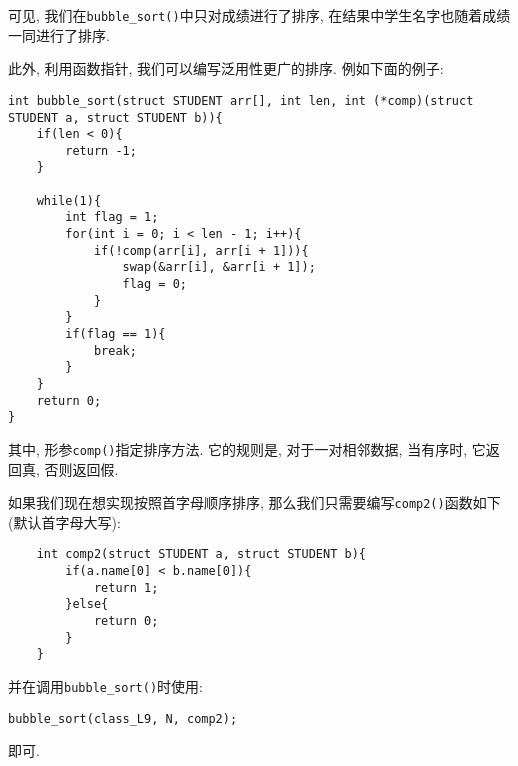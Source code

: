     可见, 我们在\texttt{bubble\_sort()}中只对成绩进行了排序, 在结果中学生名字也随着成绩一同进行了排序.

    \begin{mdframed}[linecolor=gray]

    此外, 利用函数指针, 我们可以编写泛用性更广的排序. 例如下面的例子:
\begin{lstlisting}
int bubble_sort(struct STUDENT arr[], int len, int (*comp)(struct STUDENT a, struct STUDENT b)){
    if(len < 0){
        return -1;
    }

    while(1){
        int flag = 1;
        for(int i = 0; i < len - 1; i++){
            if(!comp(arr[i], arr[i + 1])){
                swap(&arr[i], &arr[i + 1]);
                flag = 0;
            }
        }
        if(flag == 1){
            break;
        }
    }
    return 0;
}
\end{lstlisting}

    其中, 形参\texttt{comp()}指定排序方法. 它的规则是, 对于一对相邻数据, 当有序时, 它返回真, 否则返回假.

    如果我们现在想实现按照首字母顺序排序, 那么我们只需要编写\texttt{comp2()}函数如下(默认首字母大写):
\begin{lstlisting}
    int comp2(struct STUDENT a, struct STUDENT b){
        if(a.name[0] < b.name[0]){
            return 1;
        }else{
            return 0;
        }
    }
\end{lstlisting}
    并在调用\texttt{bubble\_sort()}时使用:
\begin{lstlisting}
bubble_sort(class_L9, N, comp2);
\end{lstlisting}
    即可.   

    \end{mdframed}